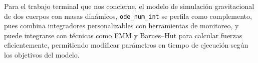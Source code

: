 Para el trabajo terminal que nos concierne, el modelo de simulación gravitacional de dos cuerpos con masas dinámicos, \texttt{ode\_num\_int} se perfila como complemento, pues combina integradores personalizables con herramientas de monitoreo, y puede integrarse con técnicas como FMM y Barnes–Hut para calcular fuerzas eficientemente, permitiendo modificar parámetros en tiempo de ejecución según los objetivos del modelo.

%
%
%
